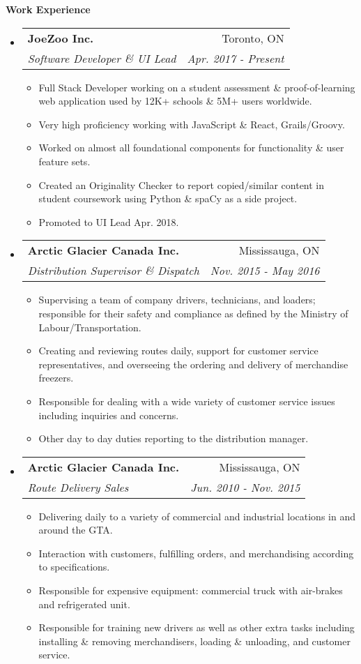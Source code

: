 \documentclass[letterpaper,11pt]{article}
\makeatletter
\newcommand{\resitem}[1]{\item #1 \vspace{-2pt}}
\newcommand{\ressubheading}[4]{
\begin{tabular*}{6.5in}{l@{\extracolsep{\fill}}r}
		\textbf{#1} & #2 \\
		\textit{#3} & \textit{#4} \\
\end{tabular*}\vspace{-6pt}}
\makeatother
\begin{document}
\begin{mdframed}[backgroundcolor=light-gray]
\textbf{Work Experience}
\end{mdframed}
\begin{itemize}
\item
	\ressubheading{JoeZoo Inc.}{Toronto, ON}{Software Developer \& UI Lead}{Apr. 2017 - Present}
	\begin{itemize}
		\resitem{Full Stack Developer working on a student assessment \& proof-of-learning web application used by 12K+ schools \& 5M+ users worldwide.}
		\resitem{Very high proficiency working with JavaScript \& React, Grails/Groovy.}
		\resitem{Worked on almost all foundational components for functionality \& user feature sets.}
		\resitem{Created an Originality Checker to report copied/similar content in student coursework using Python \& spaCy as a side project.}
		\resitem{Promoted to UI Lead Apr. 2018.}
	\end{itemize}
\item
	\ressubheading{Arctic Glacier Canada Inc.}{Mississauga, ON}{Distribution Supervisor \& Dispatch}{Nov. 2015 - May 2016}
	\begin{itemize}
		\resitem{Supervising a team of company drivers, technicians, and loaders; responsible for their safety and compliance as defined by the Ministry of Labour/Transportation.}
		\resitem{Creating and reviewing routes daily, support for customer service representatives, and overseeing the ordering and delivery of merchandise freezers.}
		\resitem{Responsible for dealing with a wide variety of customer service issues including inquiries and concerns.}
		\resitem{Other day to day duties reporting to the distribution manager.}
	\end{itemize}
\item
	\ressubheading{Arctic Glacier Canada Inc.}{Mississauga, ON}{Route Delivery Sales}{Jun. 2010 - Nov. 2015}
	\begin{itemize}
		\resitem{Delivering daily to a variety of commercial and industrial locations in and around the GTA.}
		\resitem{Interaction with customers, fulfilling orders, and merchandising according to specifications.}
		\resitem{Responsible for expensive equipment: commercial truck with air-brakes and refrigerated unit.}
		\resitem{Responsible for training new drivers as well as other extra tasks including installing \& removing merchandisers, loading \& unloading, and customer service.}
	\end{itemize}
\end{itemize}
\end{document}
